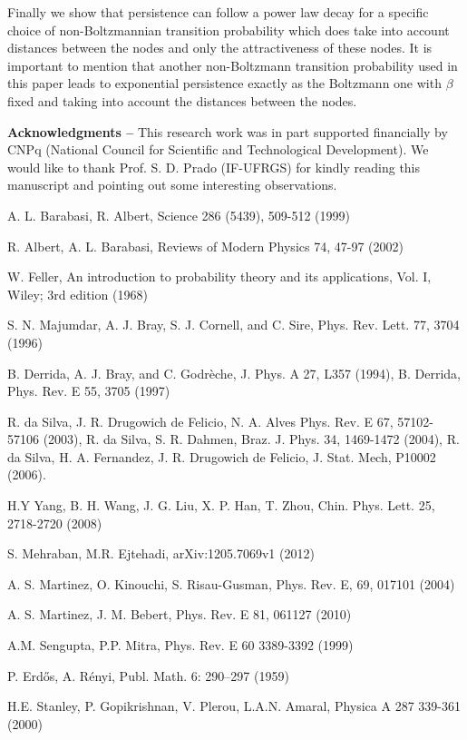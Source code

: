 \documentclass[3p, 11pt]{elsarticle}
\begin{document}
Finally we show that persistence can follow a power law decay for a specific
choice of non-Boltzmannian transition probability which does take into
account distances between the nodes and only the attractiveness of these
nodes. It is important to mention that another non-Boltzmann transition
probability used in this paper leads to exponential persistence exactly as
the Boltzmann one with $\beta $ fixed and taking into account the distances
between the nodes.


\textbf{Acknowledgments --} This research work was in part supported
financially by CNPq (National Council for Scientific and Technological
Development). We would like to thank Prof. S. D. Prado (IF-UFRGS) for kindly reading this manuscript and pointing out some interesting observations. 


\begin{thebibliography}{99}
 A. L. Barabasi, R. Albert, Science 286 (5439),
509-512 (1999)

 R. Albert, A. L. Barabasi, Reviews of Modern Physics
74, 47-97 (2002)

 W. Feller, An introduction to probability theory and
its applications, Vol. I, Wiley; 3rd edition (1968)

 S. N. Majumdar, A. J. Bray, S. J. Cornell, and C.
Sire, Phys. Rev. Lett. 77, 3704 (1996)

 B. Derrida, A. J. Bray, and C. Godr\`{e}che, J. Phys. A
27, L357 (1994), B. Derrida, Phys. Rev. E 55, 3705 (1997)

 R. da Silva, J. R. Drugowich de Felicio, N. A.
Alves Phys. Rev. E 67, 57102-57106 (2003), R. da Silva, S. R. Dahmen, Braz.
J. Phys. 34, 1469-1472 (2004), R. da Silva, H. A. Fernandez, J. R. Drugowich
de Felicio, J. Stat. Mech, P10002 (2006).

 H.Y Yang, B. H. Wang, J. G. Liu, X. P. Han, T. Zhou,
Chin. Phys. Lett. 25, 2718-2720 (2008)

 S. Mehraban, M.R. Ejtehadi, arXiv:1205.7069v1 (2012)

 A. S. Martinez, O. Kinouchi, S. Risau-Gusman, Phys. Rev.
E, 69, 017101 (2004)

 A. S. Martinez, J. M. Bebert, Phys. Rev. E 81, 061127
(2010)

 A.M. Sengupta, P.P. Mitra, Phys. Rev. E 60 3389-3392
(1999)

 P. Erd\H{o}s, A. R\'{e}nyi, Publ. Math. 6: 290--297
(1959)

 H.E. Stanley, P. Gopikrishnan, V. Plerou, L.A.N.
Amaral, Physica A 287 339-361 (2000)
\end{thebibliography}
\end{document}
